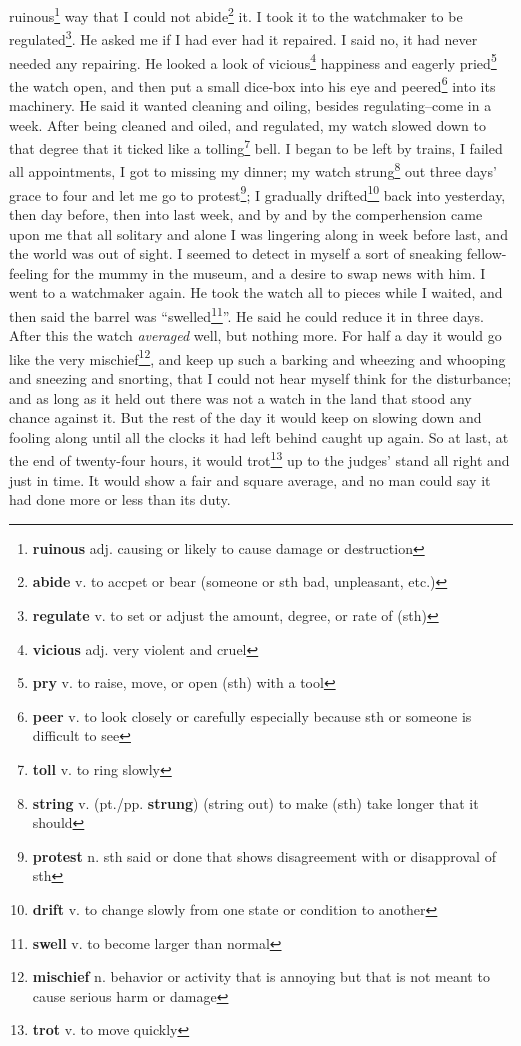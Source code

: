 ruinous\footnote{\textbf{ruinous} adj. causing or likely to cause damage or destruction} way that I could not abide\footnote{\textbf{abide} v. to accpet or bear (someone or sth bad, unpleasant, etc.)} it. I took it to the watchmaker to be regulated\footnote{\textbf{regulate} v. to set or adjust the amount, degree, or rate of (sth)}. He asked me if I had ever had it repaired. I said no, it had never needed any repairing. He looked a look of vicious\footnote{\textbf{vicious} adj. very violent and cruel} happiness and eagerly pried\footnote{\textbf{pry} v. to raise, move, or open (sth) with a tool} the watch open, and then put a small dice-box into his eye and peered\footnote{\textbf{peer} v. to look closely or carefully especially because sth or someone is difficult to see} into its machinery. He said it wanted cleaning and oiling, besides regulating--come in a week. After being cleaned and oiled, and regulated, my watch slowed down to that degree that it ticked like a tolling\footnote{\textbf{toll} v. to ring slowly} bell. I began to be left by trains, I failed all appointments, I got to missing my dinner; my watch strung\footnote{\textbf{string} v. (pt./pp. \textbf{strung}) (string out) to make (sth) take longer that it should} out three days' grace to four and let me go to protest\footnote{\textbf{protest} n. sth said or done that shows disagreement with or disapproval of sth}; I gradually drifted\footnote{\textbf{drift} v. to change slowly from one state or condition to another} back into yesterday, then day before, then into last week, and by and by the comperhension came upon me that all solitary and alone I was lingering along in week before last, and the world was out of sight. I seemed to detect in myself a sort of sneaking fellow-feeling for the mummy in the museum, and a desire to swap news with him. I went to a watchmaker again. He took the watch all to pieces while I waited, and then said the barrel was ``swelled\footnote{\textbf{swell} v. to become larger than normal}''. He said he could reduce it in three days. After this the watch \textit{averaged} well, but nothing more. For half a day it would go like the very mischief\footnote{\textbf{mischief} n. behavior or activity that is annoying but that is not meant to cause serious harm or damage}, and keep up such a barking and wheezing and whooping and sneezing and snorting, that I could not hear myself think for the disturbance; and as long as it held out there was not a watch in the land that stood any chance against it. But the rest of the day it would keep on slowing down and fooling along until all the clocks it had left behind caught up again. So at last, at the end of twenty-four hours, it would trot\footnote{\textbf{trot} v. to move quickly} up to the judges' stand all right and just in time. It would show a fair and square average, and no man could say it had done more or less than its duty. 
